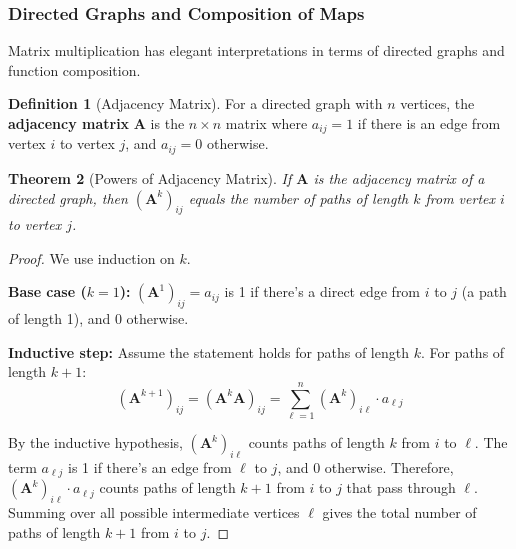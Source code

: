\documentclass[12pt]{article}
\numberwithin{equation}{section}
\newcommand{\mat}[1]{\mathbf{#1}}        %
\theoremstyle{plain}
\newtheorem{theorem}{Theorem}[section]
\theoremstyle{definition}
\newtheorem{definition}[theorem]{Definition}
\theoremstyle{remark}
\begin{document}
\subsubsection{Directed Graphs and Composition of Maps}

Matrix multiplication has elegant interpretations in terms of directed graphs and function composition.

\begin{definition}[Adjacency Matrix]
For a directed graph with $n$ vertices, the \textbf{adjacency matrix} $\mat{A}$ is the $n \times n$ matrix where $a_{ij} = 1$ if there is an edge from vertex $i$ to vertex $j$, and $a_{ij} = 0$ otherwise.
\end{definition}

\begin{theorem}[Powers of Adjacency Matrix]
If $\mat{A}$ is the adjacency matrix of a directed graph, then $(\mat{A}^k)_{ij}$ equals the number of paths of length $k$ from vertex $i$ to vertex $j$.
\end{theorem}

\begin{proof}
We use induction on $k$.

\textbf{Base case ($k = 1$):} $(\mat{A}^1)_{ij} = a_{ij}$ is 1 if there's a direct edge from $i$ to $j$ (a path of length 1), and 0 otherwise.

\textbf{Inductive step:} Assume the statement holds for paths of length $k$. For paths of length $k+1$:
$$(\mat{A}^{k+1})_{ij} = (\mat{A}^k \mat{A})_{ij} = \sum_{\ell=1}^n (\mat{A}^k)_{i\ell} \cdot a_{\ell j}$$

By the inductive hypothesis, $(\mat{A}^k)_{i\ell}$ counts paths of length $k$ from $i$ to $\ell$. The term $a_{\ell j}$ is 1 if there's an edge from $\ell$ to $j$, and 0 otherwise. Therefore, $(\mat{A}^k)_{i\ell} \cdot a_{\ell j}$ counts paths of length $k+1$ from $i$ to $j$ that pass through $\ell$. Summing over all possible intermediate vertices $\ell$ gives the total number of paths of length $k+1$ from $i$ to $j$.
\end{proof}
\end{document}
